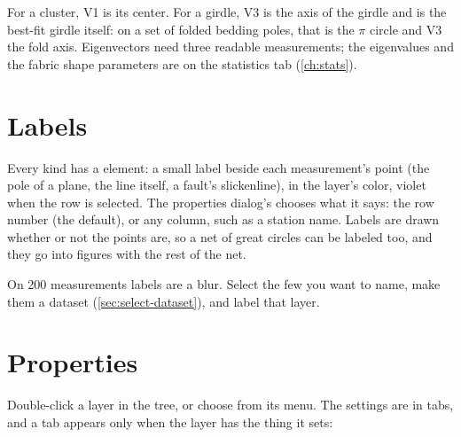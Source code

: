 For a cluster, V1 is its center. For a girdle, V3 is the axis of the girdle and  is
the best-fit girdle itself: on a set of folded bedding poles, that is the $\pi$ circle and V3 the fold axis.
Eigenvectors need three readable measurements; the eigenvalues and the fabric shape parameters are on the
statistics tab (\cref{ch:stats}).

\section{Labels}\label{sec:labels}

Every kind has a  element: a small label beside each measurement's point (the pole of a
plane, the line itself, a fault's slickenline), in the layer's color, violet when the row is selected.
The properties dialog's  chooses what it says: the row number (the default), or any
column, such as a station name. Labels are drawn whether or not the points are, so a net of great
circles can be labeled too, and they go into figures with the rest of the net.

\begin{tip}
On 200 measurements labels are a blur. Select the few you want to name, make them a dataset
(\cref{sec:select-dataset}), and label that layer.
\end{tip}

\section{Properties}\label{sec:properties}


Double-click a layer in the tree, or choose  from its menu. The settings are in tabs, and
a tab appears only when the layer has the thing it sets:

